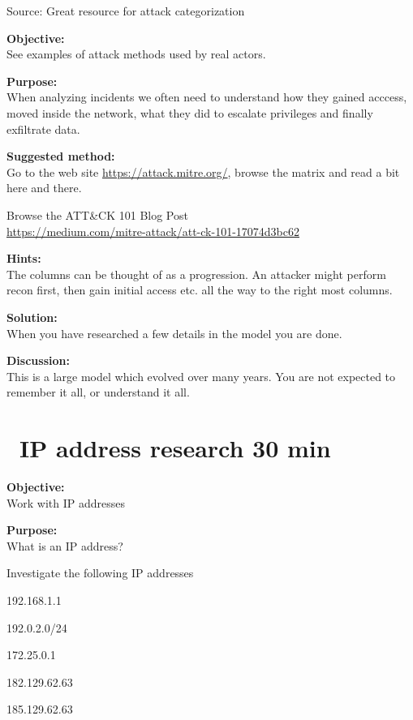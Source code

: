 \documentclass[a4paper,11pt,notitlepage]{report}
\begin{document}

Source:  Great resource for attack categorization



{\bf Objective:}\\
See examples of attack methods used by real actors.


{\bf Purpose:}\\
When analyzing incidents we often need to understand how they gained acccess, moved inside the network, what they did to escalate privileges and finally exfiltrate data.

{\bf Suggested method:}\\
Go to the web site \url{https://attack.mitre.org/}, browse the matrix and read a bit here and there.

Browse the ATT\&CK 101 Blog Post\\
\url{https://medium.com/mitre-attack/att-ck-101-17074d3bc62}


{\bf Hints:}\\
The columns can be thought of as a progression. An attacker might perform recon first, then gain initial access etc. all the way to the right most columns.

{\bf Solution:}\\
When you have researched a few details in the model you are done.

{\bf Discussion:}\\
This is a large model which evolved over many years. You are not expected to remember it all, or understand it all.





\chapter{\faExclamationTriangle\ IP address research 30 min}
\label{ex:ip-address-research}

{\bf Objective:}\\
Work with IP addresses

{\bf Purpose:}\\
What is an IP address?

Investigate the following IP addresses
\begin{list2}
\item 192.168.1.1
\item 192.0.2.0/24
\item 172.25.0.1
\item 182.129.62.63
\item 185.129.62.63
\end{list2}
\end{document}
